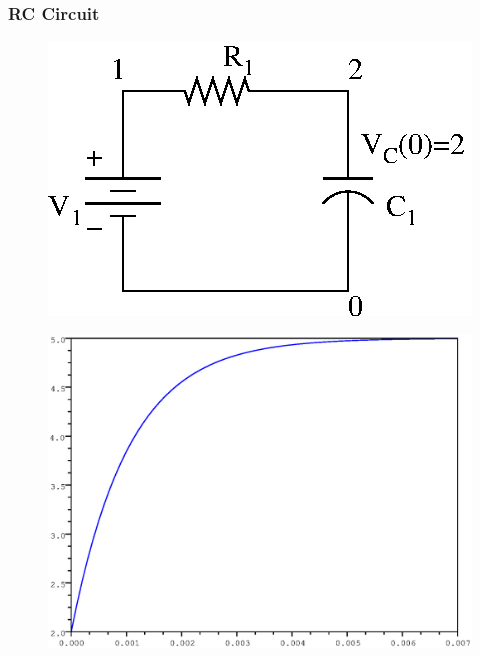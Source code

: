 \documentclass{beamer}
\begin{document}
\begin{frame}
\frametitle{RC Circuit}
\begin{minipage}[!b]{0.4\linewidth} %
\begin{figure}[h]
\centering
\includegraphics[scale=0.8]{../figures/RC.eps}
\end{figure}
\end{minipage}
\hspace{0.5cm} %
\begin{minipage}[!b]{0.5\linewidth} %
\begin{figure}[h]
\centering
\includegraphics[scale=0.3]{../figures/RCOutput.eps}
\end{figure}
\end{minipage}
\end{frame}
\end{document}
